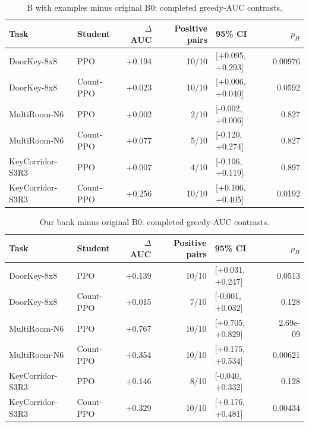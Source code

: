 \begin{table}[htbp]\centering\small

\caption{B with examples minus original B0: completed greedy-AUC contrasts.}

\begin{tabular}{@{}llrrlr@{}}\toprule

Task & Student & $\Delta$AUC & Positive pairs & 95\% CI & $p_H$\\\midrule

DoorKey-8x8 & PPO & +0.194 & 10/10 & [+0.095, +0.293] & 0.00976\\

DoorKey-8x8 & Count-PPO & +0.023 & 10/10 & [+0.006, +0.040] & 0.0592\\

MultiRoom-N6 & PPO & +0.002 & 2/10 & [-0.002, +0.006] & 0.827\\

MultiRoom-N6 & Count-PPO & +0.077 & 5/10 & [-0.120, +0.274] & 0.827\\

KeyCorridor-S3R3 & PPO & +0.007 & 4/10 & [-0.106, +0.119] & 0.897\\

KeyCorridor-S3R3 & Count-PPO & +0.256 & 10/10 & [+0.106, +0.405] & 0.0192\\

\bottomrule\end{tabular}\end{table}

\begin{table}[htbp]\centering\small

\caption{Our bank minus original B0: completed greedy-AUC contrasts.}

\begin{tabular}{@{}llrrlr@{}}\toprule

Task & Student & $\Delta$AUC & Positive pairs & 95\% CI & $p_H$\\\midrule

DoorKey-8x8 & PPO & +0.139 & 10/10 & [+0.031, +0.247] & 0.0513\\

DoorKey-8x8 & Count-PPO & +0.015 & 7/10 & [-0.001, +0.032] & 0.128\\

MultiRoom-N6 & PPO & +0.767 & 10/10 & [+0.705, +0.829] & 2.69e-09\\

MultiRoom-N6 & Count-PPO & +0.354 & 10/10 & [+0.175, +0.534] & 0.00621\\

KeyCorridor-S3R3 & PPO & +0.146 & 8/10 & [-0.040, +0.332] & 0.128\\

KeyCorridor-S3R3 & Count-PPO & +0.329 & 10/10 & [+0.176, +0.481] & 0.00434\\

\bottomrule\end{tabular}\end{table}

